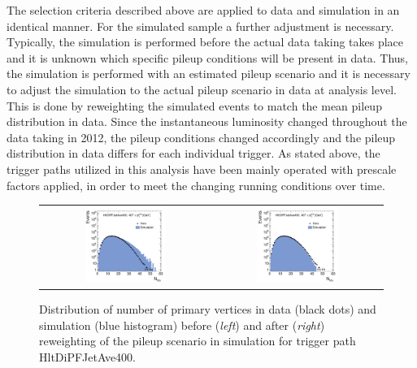 The selection criteria described above are applied to data and simulation in an identical manner. For the simulated sample a further adjustment is necessary. Typically, the simulation is performed before the actual data taking takes place and it is unknown which specific pileup conditions will be present in data. Thus, the simulation is performed with an estimated pileup scenario and it is necessary to adjust the simulation to the actual pileup scenario in data at analysis level. This is done by reweighting the simulated events to match the mean pileup distribution in data. Since the instantaneous luminosity changed throughout the data taking in 2012, the pileup conditions changed accordingly and the pileup distribution in data differs for each individual trigger. As stated above, the trigger paths utilized in this analysis have been mainly operated with prescale factors applied, in order to meet the changing running conditions over time. 
\begin{figure}[!t]
  \centering
  \begin{tabular}{cc}
                \includegraphics[width=0.49\textwidth]{figures/NVtx_HltDiPFJetAve400_AfterTriggerSelection.pdf} &
                \includegraphics[width=0.49\textwidth]{figures/NVtx_HltDiPFJetAve400_AfterPUReweighting.pdf}
  \end{tabular}
  \caption{Distribution of number of primary vertices in data (black dots) and simulation (blue histogram) before (\textit{left}) and after (\textit{right}) reweighting of the pileup scenario in simulation for trigger path HltDiPFJetAve400.}
  \label{fig:pu_reweight}
\end{figure}
